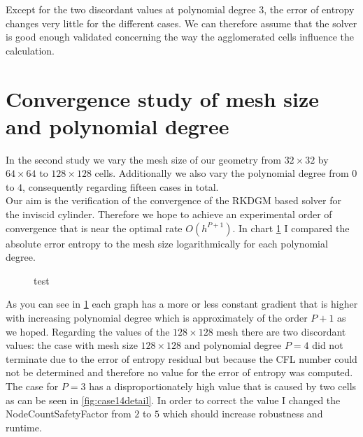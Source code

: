 	Except for the two discordant values at polynomial degree $3$, the error of entropy changes very little for the different cases. We can therefore assume that the solver is good enough validated concerning the way the agglomerated cells influence the calculation. 
	
	\section{Convergence study of mesh size and polynomial degree}
	
	In the second study we vary the mesh size of our geometry from $32 \times 32$ by $64 \times 64$ to $128 \times 128$ cells. Additionally we also vary the polynomial degree from $0$ to $4$, consequently regarding fifteen cases in total. \\
	Our aim is the verification of the convergence of the RKDGM based solver for the inviscid cylinder. Therefore we hope to achieve an experimental order of convergence that is near the optimal rate $O(h^{P+1})$. In chart \ref{mesherror} I compared the absolute error entropy to the mesh size logarithmically for each polynomial degree. 	
	\begin{figure}[htp]
		\centering		
		\label{mesherror}	
		\caption{test}
	\end{figure}

	As you can see in \ref{mesherror} each graph has a more or less constant gradient that is higher with increasing polynomial degree which is approximately of the order $P+1$ as we hoped. Regarding the values of the $128 \times 128$ mesh there are two discordant values: the case with mesh size $128 \times 128$ and polynomial degree $P = 4$ did not terminate due to the error of entropy residual but because the CFL number could not be determined and therefore no value for the error of entropy was computed. The case for $P = 3$ has a disproportionately high value that is caused by two cells as can be seen in \ref{fig:case14detail}. In order to correct the value I changed the NodeCountSafetyFactor  from $2$ to $5$ which should increase robustness and runtime.
	

